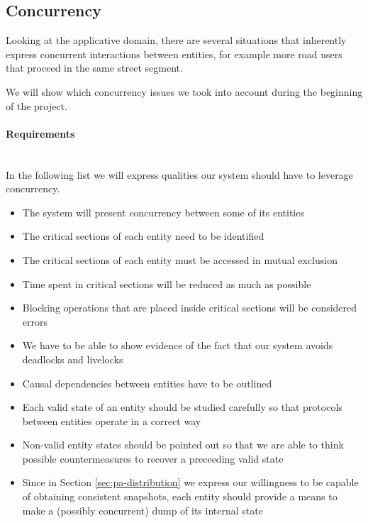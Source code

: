 \subsection{Concurrency}\label{sec:pa-concurrency}
Looking at the applicative domain, there are several situations that inherently
express concurrent interactions between entities, for example more road users
that proceed in the same street segment.

We will show which concurrency issues we took into account during the beginning
of the project.

\paragraph{Requirements} \mbox{} \\

In the following list we will express qualities our system should have to
leverage concurrency.

\begin{itemize}
\item The system will present concurrency between some of its entities
\item The critical sections of each entity need to be identified
\item The critical sections of each entity  must be accessed in mutual
  exclusion
\item Time spent in critical sections will be reduced as much as possible
\item Blocking operations that are placed inside critical sections will be
  considered errors
\item We have to be able to show evidence of the fact that our system avoids
  deadlocks and livelocks
\item Causal dependencies between entities have to be outlined
\item Each valid state of an entity should be studied carefully so that
  protocols between entities operate in a correct way
\item Non-valid entity states should be pointed out so that we are able to
  think possible countermeasures to recover a preceeding valid state
\item Since in Section \ref{sec:pa-distribution} we express our willingness to
  be capable of obtaining consistent snapshots, each entity should provide a
  means to make a (possibly concurrent) dump of its internal state
\end{itemize}


